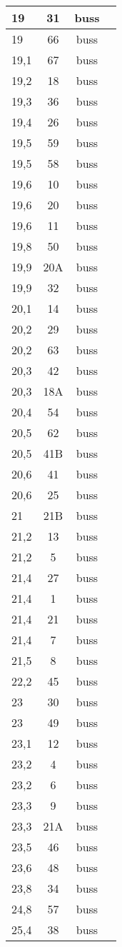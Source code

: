 \begin{longtable}{|l|c|c|c|}
19	&	31	&	buss	\\ \hline
19	&	66	&	buss	\\ \hline
19,1	&	67	&	buss	\\ \hline
19,2	&	18	&	buss	\\ \hline
19,3	&	36	&	buss	\\ \hline
19,4	&	26	&	buss	\\ \hline
19,5	&	59	&	buss	\\ \hline
19,5	&	58	&	buss	\\ \hline
19,6	&	10	&	buss	\\ \hline
19,6	&	20	&	buss	\\ \hline
19,6	&	11	&	buss	\\ \hline
19,8	&	50	&	buss	\\ \hline
19,9	&	20A	&	buss	\\ \hline
19,9	&	32	&	buss	\\ \hline
20,1	&	14	&	buss	\\ \hline
20,2	&	29	&	buss	\\ \hline
20,2	&	63	&	buss	\\ \hline
20,3	&	42	&	buss	\\ \hline
20,3	&	18A	&	buss	\\ \hline
20,4	&	54	&	buss	\\ \hline
20,5	&	62	&	buss	\\ \hline
20,5	&	41B	&	buss	\\ \hline
20,6	&	41	&	buss	\\ \hline
20,6	&	25	&	buss	\\ \hline
21	&	21B	&	buss	\\ \hline
21,2	&	13	&	buss	\\ \hline
21,2	&	5	&	buss	\\ \hline
21,4	&	27	&	buss	\\ \hline
21,4	&	1	&	buss	\\ \hline
21,4	&	21	&	buss	\\ \hline
21,4	&	7	&	buss	\\ \hline
21,5	&	8	&	buss	\\ \hline
22,2	&	45	&	buss	\\ \hline
23	&	30	&	buss	\\ \hline
23	&	49	&	buss	\\ \hline
23,1	&	12	&	buss	\\ \hline
23,2	&	4	&	buss	\\ \hline
23,2	&	6	&	buss	\\ \hline
23,3	&	9	&	buss	\\ \hline
23,3	&	21A	&	buss	\\ \hline
23,5	&	46	&	buss	\\ \hline
23,6	&	48	&	buss	\\ \hline
23,8	&	34	&	buss	\\ \hline
24,8	&	57	&	buss	\\ \hline
25,4	&	38	&	buss	\\ \hline
\end{longtable} 
